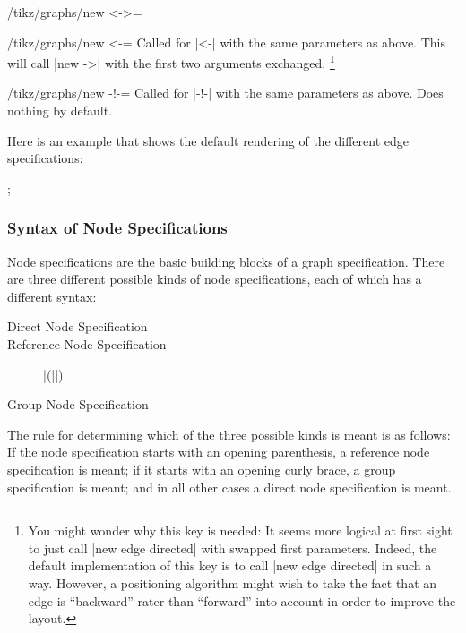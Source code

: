 \begin{enumerate}
\begin{key}{/tikz/graphs/new <->=}
  \end{key}
  \begin{key}{/tikz/graphs/new <-=}
    Called for |<-| with the same parameters as above. This will call
    |new ->| with the first two arguments exchanged.%
    \footnote{You might
      wonder why this key is needed: It seems more logical at first
      sight to just call |new edge directed| with swapped first
      parameters. Indeed, the default implementation of this key is to
      call |new edge directed| in such a way. However, a positioning
      algorithm might wish to take the fact that an edge is
      ``backward'' rater than ``forward'' into account in order to
      improve the layout.}
  \end{key}
  \begin{key}{/tikz/graphs/new -!-=}
    Called for |-!-| with the same parameters as above. Does nothing
    by default.
  \end{key}
\end{enumerate}

Here is an example that shows the default rendering of the different
edge specifications:

\begin{codeexample}[]
\tikz {};  
\end{codeexample}


\subsubsection{Syntax of Node Specifications}

\label{section-library-graphs-node-spec}

Node specifications are the basic building blocks of a graph
specification. There are three different possible kinds of node
specifications, each of which has a different syntax: 

\begin{description}
\item[Direct Node Specification]  
\item[Reference Node Specification] |(||)|
\item[Group Node Specification] 
\end{description}

The rule for determining which of the three possible kinds is meant is
as follows: If the node specification starts with an opening
parenthesis, a reference node specification is meant; if it starts
with an opening curly brace, a group specification is meant; and in
all other cases a direct node specification is meant.

